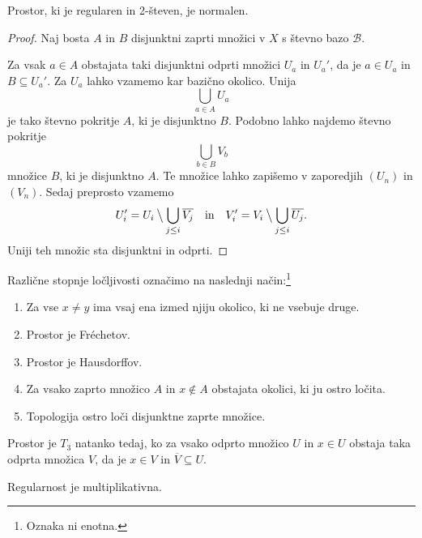 \obvs

\begin{izrek}[Tihon]
Prostor, ki je regularen in 2-števen, je normalen.
\end{izrek}

\begin{proof}
Naj bosta $A$ in $B$ disjunktni zaprti množici v $X$ s števno bazo
$\mathcal{B}$.

Za vsak $a \in A$ obstajata taki disjunktni odprti množici $U_a$ in
$U_a'$, da je $a \in U_a$ in $B \subseteq U_a'$. Za $U_a$ lahko
vzamemo kar bazično okolico. Unija
\[
\bigcup_{a \in A} U_a
\]
je tako števno pokritje $A$, ki je disjunktno $B$. Podobno lahko
najdemo števno pokritje
\[
\bigcup_{b \in B} V_b
\]
množice $B$, ki je disjunktno $A$. Te množice lahko zapišemo v
zaporedjih $(U_n)$ in $(V_n)$. Sedaj preprosto vzamemo
\[
U_i' = U_i \mathbin{\big\backslash} \bigcup_{j \leq i} \overline{V_j}
\quad \text{in} \quad
V_i' = V_i \mathbin{\big\backslash} \bigcup_{j \leq i} \overline{U_j}.
\]
Uniji teh množic sta disjunktni in odprti.
\end{proof}

\begin{definicija}
Različne stopnje ločljivosti označimo na naslednji način:\footnote{
Oznaka ni enotna.}

\begin{enumerate}[label=$T_{\arabic*}$:, start=0]
\item Za vse $x \ne y$ ima vsaj ena izmed njiju okolico, ki ne
vsebuje druge.
\item Prostor je Fréchetov.
\item Prostor je Hausdorffov.
\item Za vsako zaprto množico $A$ in $x \not \in A$ obstajata
okolici, ki ju ostro ločita.
\item Topologija ostro loči disjunktne zaprte množice.
\end{enumerate}
\end{definicija}

\begin{trditev}
Prostor je $T_3$ natanko tedaj, ko za vsako odprto množico $U$ in
$x \in U$ obstaja taka odprta množica $V$, da je $x \in V$ in
$\overline{V} \subseteq U$.
\end{trditev}

\obvs

\begin{trditev}
Regularnost je multiplikativna.
\end{trditev}


